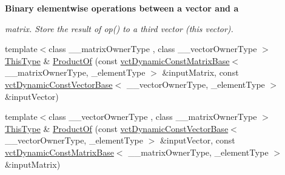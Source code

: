 \begin{Indent}{\bf Binary elementwise operations between a vector and a}\par
{\em matrix. Store the result of op() to a third vector (this vector). }\begin{DoxyCompactItemize}
\item 
{\footnotesize template$<$class \+\_\+\+\_\+matrix\+Owner\+Type , class \+\_\+\+\_\+vector\+Owner\+Type $>$ }\\\hyperlink{classvct_dynamic_const_vector_base_a39da273523717f678f54d3321ebca3dd}{This\+Type} \& \hyperlink{classvct_dynamic_vector_base_aae3e15da4eae6cb4df0d982984b2de42}{Product\+Of} (const \hyperlink{classvct_dynamic_const_matrix_base}{vct\+Dynamic\+Const\+Matrix\+Base}$<$ \+\_\+\+\_\+matrix\+Owner\+Type, \+\_\+element\+Type $>$ \&input\+Matrix, const \hyperlink{classvct_dynamic_const_vector_base}{vct\+Dynamic\+Const\+Vector\+Base}$<$ \+\_\+\+\_\+vector\+Owner\+Type, \+\_\+element\+Type $>$ \&input\+Vector)
\item 
{\footnotesize template$<$class \+\_\+\+\_\+vector\+Owner\+Type , class \+\_\+\+\_\+matrix\+Owner\+Type $>$ }\\\hyperlink{classvct_dynamic_const_vector_base_a39da273523717f678f54d3321ebca3dd}{This\+Type} \& \hyperlink{classvct_dynamic_vector_base_ad86a700afbc9feafd2cec7b61db67706}{Product\+Of} (const \hyperlink{classvct_dynamic_const_vector_base}{vct\+Dynamic\+Const\+Vector\+Base}$<$ \+\_\+\+\_\+vector\+Owner\+Type, \+\_\+element\+Type $>$ \&input\+Vector, const \hyperlink{classvct_dynamic_const_matrix_base}{vct\+Dynamic\+Const\+Matrix\+Base}$<$ \+\_\+\+\_\+matrix\+Owner\+Type, \+\_\+element\+Type $>$ \&input\+Matrix)
\end{DoxyCompactItemize}
\end{Indent}

